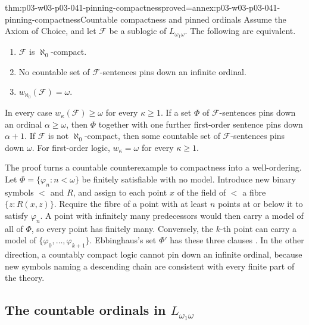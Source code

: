 \begin{hbtheorem}{thm:p03-w03-p03-041-pinning-compactness}{proved=annex:p03-w03-p03-041-pinning-compactness}{Countable compactness and pinned ordinals}
Assume the Axiom of Choice, and let \(\mathcal F\) be a sublogic of
\(L_{\omega_1\omega}\). The following are equivalent.
\begin{enumerate}
\item \(\mathcal F\) is \(\aleph_0\)-compact.
\item No countable set of \(\mathcal F\)-sentences pins down an infinite
      ordinal.
\item \(w_{\aleph_0}(\mathcal F)=\omega\).
\end{enumerate}
In every case \(w_\kappa(\mathcal F)\geq\omega\) for every
\(\kappa\geq1\). If a set \(\Phi\) of \(\mathcal F\)-sentences pins down
an ordinal \(\alpha\geq\omega\), then \(\Phi\) together with one further
first-order sentence pins down \(\alpha+1\). If \(\mathcal F\) is not
\(\aleph_0\)-compact, then some countable set of \(\mathcal F\)-sentences
pins down \(\omega\). For first-order logic, \(w_\kappa=\omega\) for
every \(\kappa\geq1\).
\end{hbtheorem}

The proof turns a countable counterexample to compactness into a
well-ordering. Let \(\Phi=\{\varphi_n:n<\omega\}\) be finitely satisfiable
with no model. Introduce new binary symbols \(<\) and \(R\), and assign to
each point \(x\) of the field of \(<\) a fibre \(\{z:R(x,z)\}\). Require
the fibre of a point with at least \(n\) points at or below it to satisfy
\(\varphi_n\). A point with infinitely many predecessors would then carry
a model of all of \(\Phi\), so every point has finitely many. Conversely,
the \(k\)-th point can carry a model of
\(\{\varphi_0,\ldots,\varphi_{k+1}\}\). Ebbinghaus's set \(\Phi'\) has
these three clauses
\cite[Ch.~II, proof of Proposition~5.2.4, p.~62]{Ebbinghaus1985ExtendedLogics}.
In the other direction, a countably compact logic cannot pin down an
infinite ordinal, because new symbols naming a descending chain are
consistent with every finite part of the theory.

\subsection{The countable ordinals in \texorpdfstring{\(L_{\omega_1\omega}\)}{L omega1 omega}}
\label{sec:p03-w03-p03-041-ordinals}

